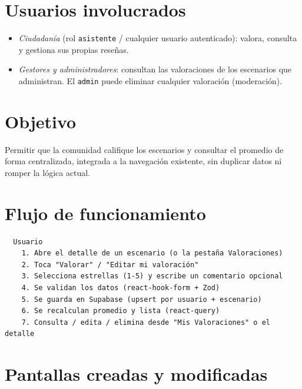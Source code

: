 \documentclass[11pt,a4paper]{article}
\begin{document}
\section{Usuarios involucrados}
\label{sec:usuarios}

\begin{itemize}
  \item \emph{Ciudadanía} (rol \texttt{asistente} / cualquier usuario autenticado): valora,
        consulta y gestiona sus propias reseñas.
  \item \emph{Gestores y administradores}: consultan las valoraciones de los escenarios que
        administran. El \texttt{admin} puede eliminar cualquier valoración (moderación).
\end{itemize}

\section{Objetivo}
\label{sec:objetivo}

Permitir que la comunidad califique los escenarios y consultar el promedio de forma centralizada,
integrada a la navegación existente, sin duplicar datos ni romper la lógica actual.

\section{Flujo de funcionamiento}
\label{sec:flujo}

\begin{verbatim}
  Usuario
    1. Abre el detalle de un escenario (o la pestaña Valoraciones)
    2. Toca "Valorar" / "Editar mi valoración"
    3. Selecciona estrellas (1-5) y escribe un comentario opcional
    4. Se validan los datos (react-hook-form + Zod)
    5. Se guarda en Supabase (upsert por usuario + escenario)
    6. Se recalculan promedio y lista (react-query)
    7. Consulta / edita / elimina desde "Mis Valoraciones" o el detalle
\end{verbatim}

\section{Pantallas creadas y modificadas}
\label{sec:pantallas}
\end{document}
